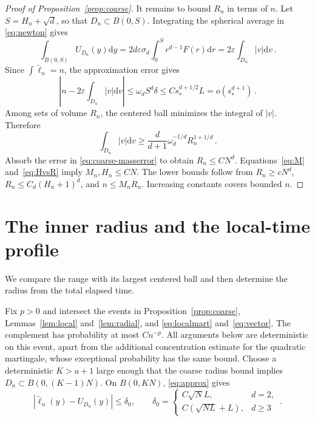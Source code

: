\documentclass[11pt]{amsart}
\theoremstyle{plain}
\theoremstyle{definition}
\newcommand{\eps}{\varepsilon}
\newcommand{\dd}{\mathrm d}
\begin{document}
\begin{proof}[Proof of Proposition~\ref{prop:coarse}]
It remains to bound $R_n$ in terms of $n$.
Let $S=H_n+\sqrt d$, so that $D_n\subset B(0,S)$.
Integrating the spherical average in \eqref{eq:newton} gives
\begin{equation}\label{eq:massidentity}
\int_{B(0,S)}U_{D_n}(y)\dd y
=2d\eps\sigma_d\int_0^S r^{d-1}F(r)\dd r
=2\eps\int_{D_n}|v|\dd v\, .
\end{equation}
Since $\int\widetilde\ell_n=n$, the approximation error gives
\begin{equation}\label{eq:coarse-masserror}
\left|n-2\eps\int_{D_n}|v|\dd v\right|
\leq\omega_dS^d\delta\leq Cs_*^{d+1/2}L=o(s_*^{d+1})\, .
\end{equation}
Among sets of volume $R_n$, the centered ball minimizes the integral
of $|v|$. Therefore
\begin{equation}\label{eq:radial-packing}
\int_{D_n}|v|\dd v\geq
\frac d{d+1}\omega_d^{-1/d}R_n^{1+1/d}\, .
\end{equation}
Absorb the error in \eqref{eq:coarse-masserror} to obtain $R_n\leq CN^d$.
Equations~\eqref{eq:M} and~\eqref{eq:HvsR} imply $M_n,H_n\leq CN$.
The lower bounds follow from $R_n\geq cN^d$,
$R_n\leq C_d(H_n+1)^d$, and $n\leq M_nR_n$.
Increasing constants covers bounded $n$.
\end{proof}
\section{The inner radius and the local-time profile}\label{sec:contact}
We compare the range with its largest centered ball and then determine
the radius from the total elapsed time.

Fix $p>0$ and intersect the events in Proposition~\ref{prop:coarse},
Lemmas~\ref{lem:local} and~\ref{lem:radial}, and
\eqref{eq:localmart} and~\eqref{eq:vector}. The complement has probability
at most $Cn^{-p}$. All arguments below are deterministic on this event,
apart from the additional concentration estimate for the quadratic
martingale, whose exceptional probability has the same bound.
Choose a deterministic $K>a+1$ large enough that the coarse radius
bound implies $D_n\subset B(0,(K-1)N)$. On $B(0,KN)$,
\eqref{eq:approx} gives
\begin{equation}\label{eq:global}
|\widetilde\ell_n(y)-U_{D_n}(y)|\leq\delta_0 ,\qquad
\delta_0=\begin{cases}C\sqrt N L,&d=2,\\
C(\sqrt{NL}+L),&d\geq3
\end{cases}\, .
\end{equation}
\end{document}
